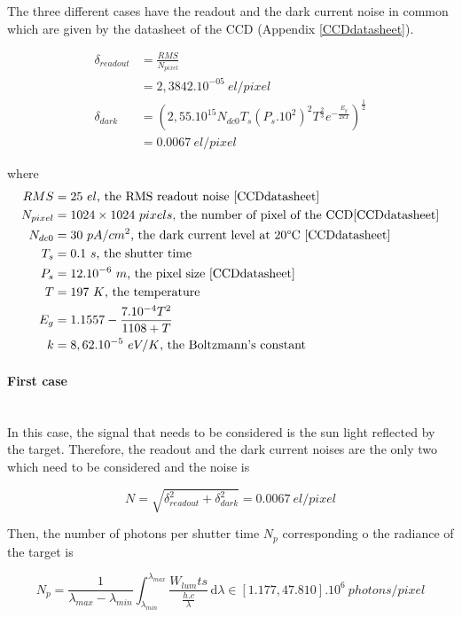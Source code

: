 The three different cases have the readout and the dark current noise in common which are given by the datasheet of the CCD (Appendix \ref{CCDdatasheet}).

\begin{align}
\delta_{readout} & = \frac{RMS}{N_{pixel}} \\
& = 2,3842.10^{-05} \ el/pixel \label{eq:readout} \\
\delta_{dark} & = \left(2,55.10^{15}N_{dc0}T_s(P_s.10^2)^2T^{\frac{2}{3}}e^{-\frac{E_g}{2kT}}\right)^{\frac{1}{2}} \\
& = 0.0067 \ el/pixel \label{eq:darkcurrent}
\end{align}

where
\begin{align*}
RMS & = 25\ el\mbox{, the RMS readout noise \ref{CCDdatasheet}}\\
N_{pixel} & = 1024\times 1024 \ pixels\mbox{, the number of pixel of the CCD\ref{CCDdatasheet}}\\
N_{dc0} & = 30\ pA/cm^2\mbox{, the dark current level at 20\textdegree C \ref{CCDdatasheet}}\\
T_s & = 0.1\ s\mbox{, the shutter time}\\
P_s & = 12.10^{-6}\ m\mbox{, the  pixel size \ref{CCDdatasheet}}\\
T & = 197\ K\mbox{, the temperature}\\
E_g & = 1.1557-\frac{7.10^{-4}T^2}{1108+T}\\
k & = 8,62.10^{-5}\ eV/K\mbox{, the Boltzmann's constant}
\end{align*}


\paragraph*{First case}
\label{first case}
~~\\
In this case, the signal that needs to be considered is the sun light reflected by the target. Therefore, the readout and the dark current noises are the only two which need to be considered and the noise is

\begin{equation}
\label{eq:Noise case1}
N = \sqrt{\delta_{readout}^2+\delta_{dark}^2} = 0.0067\ el/pixel
\end{equation}

Then, the number of photons per shutter time $N_p$ corresponding o the radiance of the target is

\begin{equation}
\label{eq:Number Photons per Shutter Time case1}
N_p = \frac{1}{\lambda_{max}-\lambda_{min}}\int_{\lambda_{min}}^{\lambda_{max}} \frac{W_{lum}ts}{\frac{h.c}{\lambda}} \, \mathrm d\lambda \in [1.177, 47.810].10^{6} \ photons/pixel
\end{equation}

